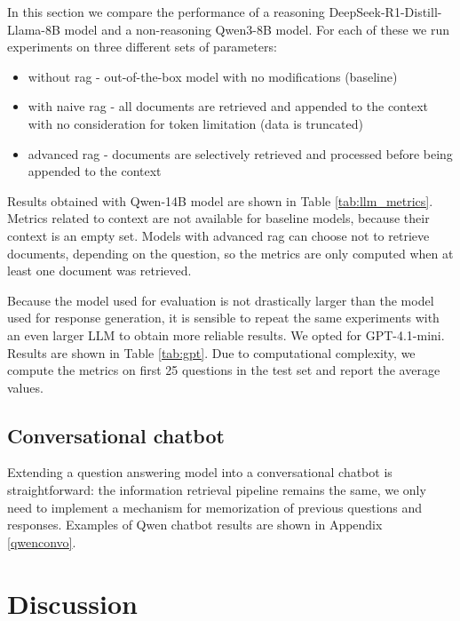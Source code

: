 \documentclass[fleqn,moreauthors,10pt]{ds_report}
\begin{document}
In this section we compare the performance of a reasoning DeepSeek-R1-Distill-Llama-8B \cite{deepseek3} model and a non-reasoning Qwen3-8B \cite{qwen3} model. For each of these we run experiments on three different sets of parameters:
\begin{itemize}
	\item without \ac{rag} - out-of-the-box model with no modifications (baseline)
	\item with naive \ac{rag} - all documents are retrieved and appended to the context with no consideration for token limitation (data is truncated)
	\item advanced \ac{rag} - documents are selectively retrieved and processed before being appended to the context
\end{itemize}

Results obtained with Qwen-14B model are shown in Table \ref{tab:llm_metrics}. Metrics related to context are not available for baseline models, because their context is an empty set. Models with advanced \ac{rag} can choose not to retrieve documents, depending on the question, so the metrics are only computed when at least one document was retrieved. 

Because the model used for evaluation is not drastically larger than the model used for response generation, it is sensible to repeat the same experiments with an even larger LLM to obtain more reliable results. We opted for GPT-4.1-mini. Results are shown in Table \ref{tab:gpt}. Due to computational complexity, we compute the metrics on first 25 questions in the test set and report the average values. 



\subsection*{Conversational chatbot}

Extending a question answering model into a conversational chatbot is straightforward: the information retrieval pipeline remains the same, we only need to implement a mechanism for memorization of previous questions and responses. Examples of Qwen chatbot results are shown in Appendix \ref{qwenconvo}.



\section*{Discussion}
\end{document}
